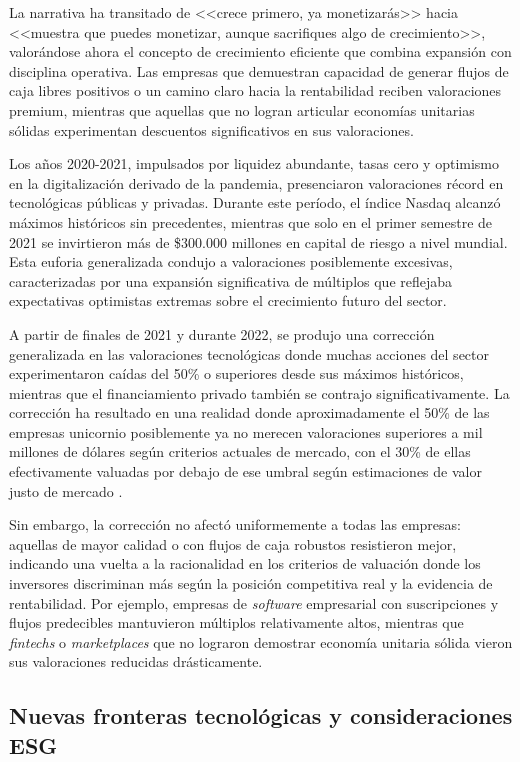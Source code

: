 La narrativa ha transitado de <<crece primero, ya monetizarás>> hacia <<muestra que puedes monetizar, aunque sacrifiques algo de crecimiento>>, valorándose ahora el concepto de crecimiento eficiente que combina expansión con disciplina operativa. Las empresas que demuestran capacidad de generar flujos de caja libres positivos o un camino claro hacia la rentabilidad reciben valoraciones premium, mientras que aquellas que no logran articular economías unitarias sólidas experimentan descuentos significativos en sus valoraciones.

Los años 2020-2021, impulsados por liquidez abundante, tasas cero y optimismo en la digitalización derivado de la pandemia, presenciaron valoraciones récord en tecnológicas públicas y privadas. Durante este período, el índice Nasdaq alcanzó máximos históricos sin precedentes, mientras que solo en el primer semestre de 2021 se invirtieron más de \$300.000 millones en capital de riesgo a nivel mundial. Esta euforia generalizada condujo a valoraciones posiblemente excesivas, caracterizadas por una expansión significativa de múltiplos que reflejaba expectativas optimistas extremas sobre el crecimiento futuro del sector.

A partir de finales de 2021 y durante 2022, se produjo una corrección generalizada en las valoraciones tecnológicas donde muchas acciones del sector experimentaron caídas del 50\% o superiores desde sus máximos históricos, mientras que el financiamiento privado también se contrajo significativamente. La corrección ha resultado en una realidad donde aproximadamente el 50\% de las empresas unicornio posiblemente ya no merecen valoraciones superiores a mil millones de dólares según criterios actuales de mercado, con el 30\% de ellas efectivamente valuadas por debajo de ese umbral según estimaciones de valor justo de mercado \citep{silicon2024}.

Sin embargo, la corrección no afectó uniformemente a todas las empresas: aquellas de mayor calidad o con flujos de caja robustos resistieron mejor, indicando una vuelta a la racionalidad en los criterios de valuación donde los inversores discriminan más según la posición competitiva real y la evidencia de rentabilidad. Por ejemplo, empresas de \emph{software} empresarial con suscripciones y flujos predecibles mantuvieron múltiplos relativamente altos, mientras que \emph{fintechs} o \emph{marketplaces} que no lograron demostrar economía unitaria sólida vieron sus valoraciones reducidas drásticamente.

\subsection{Nuevas fronteras tecnológicas y consideraciones ESG}

